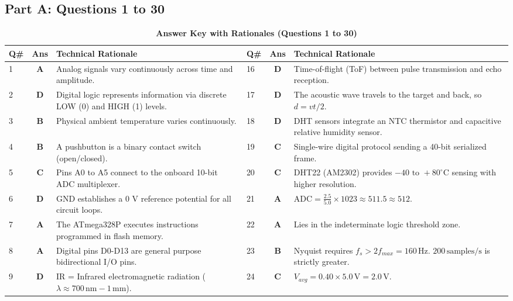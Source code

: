 \subsection*{Part A: Questions 1 to 30}
\begin{table}[htbp]
\centering
\caption{\textbf{Answer Key with Rationales (Questions 1 to 30)}}
\vspace{2mm}
\small
\begin{tabularx}{\textwidth}{l c X l c X}
\toprule
\textbf{Q\#} & \textbf{Ans} & \textbf{Technical Rationale} & \textbf{Q\#} & \textbf{Ans} & \textbf{Technical Rationale} \\
\midrule
1 & \textbf{A} & Analog signals vary continuously across time and amplitude. & 16 & \textbf{D} & Time-of-flight (ToF) between pulse transmission and echo reception. \\
2 & \textbf{D} & Digital logic represents information via discrete LOW (0) and HIGH (1) levels. & 17 & \textbf{D} & The acoustic wave travels to the target and back, so $d = vt/2$. \\
3 & \textbf{B} & Physical ambient temperature varies continuously. & 18 & \textbf{D} & DHT sensors integrate an NTC thermistor and capacitive relative humidity sensor. \\
4 & \textbf{B} & A pushbutton is a binary contact switch (open/closed). & 19 & \textbf{C} & Single-wire digital protocol sending a 40-bit serialized frame. \\
5 & \textbf{C} & Pins A0 to A5 connect to the onboard 10-bit ADC multiplexer. & 20 & \textbf{C} & DHT22 (AM2302) provides $-40\text{ to }+80^\circ\text{C}$ sensing with higher resolution. \\
6 & \textbf{D} & GND establishes a 0 V reference potential for all circuit loops. & 21 & \textbf{A} & $\text{ADC} = \frac{2.5}{5.0} \times 1023 \approx 511.5 \approx 512$. \\
7 & \textbf{A} & The ATmega328P executes instructions programmed in flash memory. & 22 & \textbf{A} & Lies in the indeterminate logic threshold zone. \\
8 & \textbf{A} & Digital pins D0-D13 are general purpose bidirectional I/O pins. & 23 & \textbf{B} & Nyquist requires $f_s > 2 f_{max} = 160\,\text{Hz}$. $200\,\text{samples/s}$ is strictly greater. \\
9 & \textbf{D} & IR = Infrared electromagnetic radiation ($\lambda \approx 700\,\text{nm}-1\,\text{mm}$). & 24 & \textbf{C} & $V_{avg} = 0.40 \times 5.0\,\text{V} = 2.0\,\text{V}$. \\

\end{tabularx}
\end{table}
